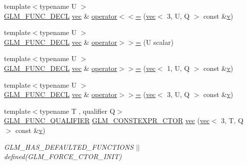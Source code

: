 \begin{DoxyCompactItemize}
\item 
{\footnotesize template$<$typename U $>$ }\\\hyperlink{setup_8hpp_ab2d052de21a70539923e9bcbf6e83a51}{G\+L\+M\+\_\+\+F\+U\+N\+C\+\_\+\+D\+E\+CL} \hyperlink{structglm_1_1vec}{vec} \& \hyperlink{structglm_1_1vec_3_013_00_01_t_00_01_q_01_4_aad0c7ea72dfec6224b1a5cabeea950fb}{operator$<$$<$=} (\hyperlink{structglm_1_1vec}{vec}$<$ 3, U, Q $>$ const \&\hyperlink{_s_d_l__opengl_8h_a10a82eabcb59d2fcd74acee063775f90}{v})
\item 
{\footnotesize template$<$typename U $>$ }\\\hyperlink{setup_8hpp_ab2d052de21a70539923e9bcbf6e83a51}{G\+L\+M\+\_\+\+F\+U\+N\+C\+\_\+\+D\+E\+CL} \hyperlink{structglm_1_1vec}{vec} \& \hyperlink{structglm_1_1vec_3_013_00_01_t_00_01_q_01_4_af6fe1a33a28847e310e829a9543143f7}{operator$>$$>$=} (U scalar)
\item 
{\footnotesize template$<$typename U $>$ }\\\hyperlink{setup_8hpp_ab2d052de21a70539923e9bcbf6e83a51}{G\+L\+M\+\_\+\+F\+U\+N\+C\+\_\+\+D\+E\+CL} \hyperlink{structglm_1_1vec}{vec} \& \hyperlink{structglm_1_1vec_3_013_00_01_t_00_01_q_01_4_a6b9d6604ed427e6098aa136ea98be7dd}{operator$>$$>$=} (\hyperlink{structglm_1_1vec}{vec}$<$ 1, U, Q $>$ const \&\hyperlink{_s_d_l__opengl_8h_a10a82eabcb59d2fcd74acee063775f90}{v})
\item 
{\footnotesize template$<$typename U $>$ }\\\hyperlink{setup_8hpp_ab2d052de21a70539923e9bcbf6e83a51}{G\+L\+M\+\_\+\+F\+U\+N\+C\+\_\+\+D\+E\+CL} \hyperlink{structglm_1_1vec}{vec} \& \hyperlink{structglm_1_1vec_3_013_00_01_t_00_01_q_01_4_a2f52f05d54329e0dddf515de1f2b32be}{operator$>$$>$=} (\hyperlink{structglm_1_1vec}{vec}$<$ 3, U, Q $>$ const \&\hyperlink{_s_d_l__opengl_8h_a10a82eabcb59d2fcd74acee063775f90}{v})
\item 
{\footnotesize template$<$typename T , qualifier Q$>$ }\\\hyperlink{setup_8hpp_a33fdea6f91c5f834105f7415e2a64407}{G\+L\+M\+\_\+\+F\+U\+N\+C\+\_\+\+Q\+U\+A\+L\+I\+F\+I\+ER} \hyperlink{setup_8hpp_ad34178a09666081abdb573c14d1f4a5a}{G\+L\+M\+\_\+\+C\+O\+N\+S\+T\+E\+X\+P\+R\+\_\+\+C\+T\+OR} \hyperlink{structglm_1_1vec_3_013_00_01_t_00_01_q_01_4_a9403cc63719b575a9a136e9de99593e4}{vec} (\hyperlink{structglm_1_1vec}{vec}$<$ 3, T, Q $>$ const \&\hyperlink{_s_d_l__opengl_8h_a10a82eabcb59d2fcd74acee063775f90}{v})
\begin{DoxyCompactList}\small\item\em G\+L\+M\+\_\+\+H\+A\+S\+\_\+\+D\+E\+F\+A\+U\+L\+T\+E\+D\+\_\+\+F\+U\+N\+C\+T\+I\+O\+NS $\vert$$\vert$ defined(\+G\+L\+M\+\_\+\+F\+O\+R\+C\+E\+\_\+\+C\+T\+O\+R\+\_\+\+I\+N\+I\+T) \end{DoxyCompactList}\item 

\end{DoxyCompactItemize}
